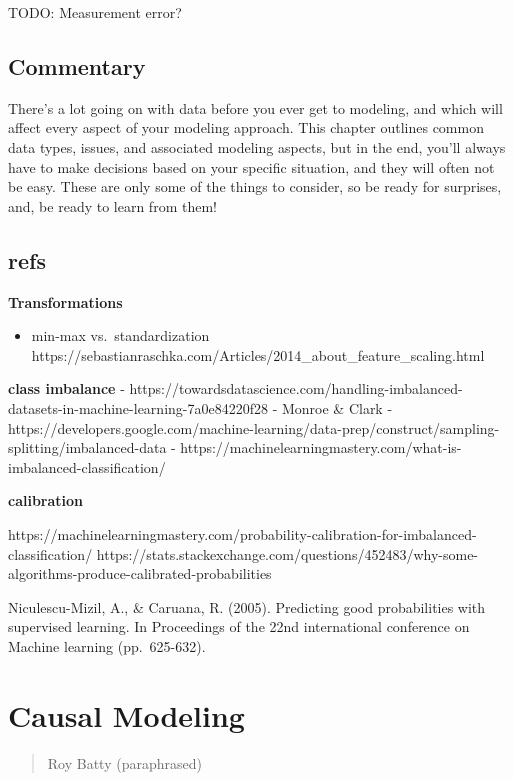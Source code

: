 \documentclass[
  letterpaper,
]{krantz}
\providecommand{\tightlist}{%
  \setlength{\itemsep}{0pt}\setlength{\parskip}{0pt}}\usepackage{longtable,booktabs,array}
\begin{document}
TODO: Measurement error?

\section{Commentary}\label{commentary-2}

There's a lot going on with data before you ever get to modeling, and
which will affect every aspect of your modeling approach. This chapter
outlines common data types, issues, and associated modeling aspects, but
in the end, you'll always have to make decisions based on your specific
situation, and they will often not be easy. These are only some of the
things to consider, so be ready for surprises, and, be ready to learn
from them!

\section{refs}\label{refs-4}

\textbf{Transformations}

\begin{itemize}
\tightlist
\item
  min-max vs.~standardization
  https://sebastianraschka.com/Articles/2014\_about\_feature\_scaling.html
\end{itemize}

\textbf{class imbalance} -
https://towardsdatascience.com/handling-imbalanced-datasets-in-machine-learning-7a0e84220f28
- Monroe \& Clark -
https://developers.google.com/machine-learning/data-prep/construct/sampling-splitting/imbalanced-data
- https://machinelearningmastery.com/what-is-imbalanced-classification/

\textbf{calibration}

https://machinelearningmastery.com/probability-calibration-for-imbalanced-classification/
https://stats.stackexchange.com/questions/452483/why-some-algorithms-produce-calibrated-probabilities

Niculescu-Mizil, A., \& Caruana, R. (2005). Predicting good
probabilities with supervised learning. In Proceedings of the 22nd
international conference on Machine learning (pp.~625-632).

\chapter{Causal Modeling}\label{causal-modeling}

\begin{quote}
\begin{description}
\tightlist
\item[All those causal effects will be lost in time, like tears in
rain\ldots{} without adequate counterfactual considerations.]
Roy Batty (paraphrased)
\end{description}
\end{quote}
\end{document}
